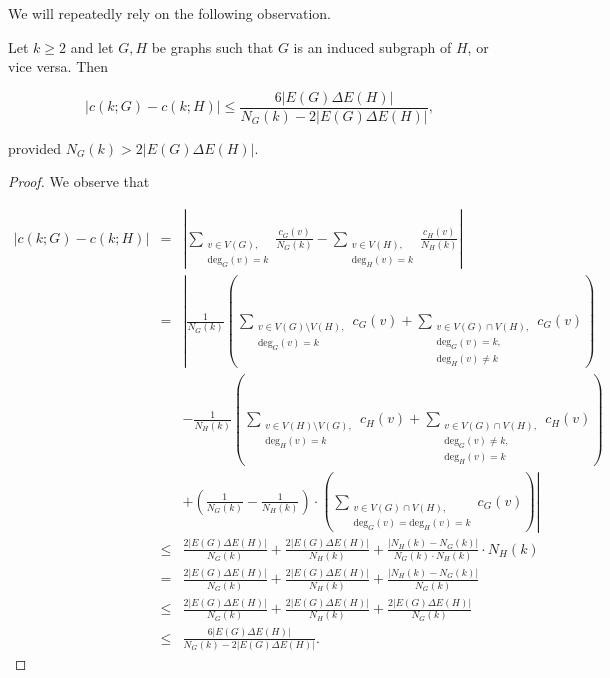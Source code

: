 We will repeatedly rely on the following observation.

\begin{lemma}\label{lem:ckGckH}
Let $k\geq 2$ and let $G, H$ be graphs such that $G$ is an induced subgraph of $H$, or vice versa.
Then

$$ \left| c(k;G) - c(k;H) \right| \leq \frac{6|E(G)\Delta E(H)|}{N_G(k) - 2|E(G)\Delta E(H)|}, $$

\noindent
provided $N_G(k) > 2|E(G)\Delta E(H)|$.
\end{lemma}

\begin{proof} 
We observe that
 
$$ \begin{array}{rcl} 
|c(k; G)-c(k;H)| 
& = & \displaystyle
\left| \sum_{\substack{v\in V(G), \\ \text{deg}_G(v)=k}} \frac{c_G(v)}{N_G(k)} - 
\sum_{\substack{v\in V(H), \\ \text{deg}_{H}(v)=k}} \frac{c_{H}(v)}{N_{H}(k)} \right| \\[8ex]
& = & \displaystyle 
\left| \frac{1}{N_G(k)} \left( \sum_{\substack{v\in V(G)\setminus V(H), \\ \text{deg}_G(v)=k} } c_G(v)
+ \sum_{\substack{v\in V(G)\cap V(H), \\ \text{deg}_G(v)=k, \\ \text{deg}_{H}(v)\neq k}} c_G(v) \right) \right. \\
& & \displaystyle
- \frac{1}{N_{H}(k)} \left(\sum_{\substack{ v\in V(H)\setminus V(G), \\ \text{deg}_{H}(v)=k} } c_{H}(v)
+ \sum_{\substack{v\in V(G)\cap V(H), \\ \text{deg}_G(v)\neq k, \\ \text{deg}_{H}(v)=k}} c_{H}(v) \right) \\
& & \displaystyle  
\left. + \left(\frac{1}{N_G(k)}-\frac{1}{N_{H}(k)} \right) \cdot 
\left( \sum_{\substack{v \in V(G)\cap V(H), \\ \text{deg}_G(v)=\text{deg}_{H}(v)=k}}
c_G(v) \right) \right| \\[8ex]
 & \leq & \displaystyle
 \frac{2|E(G)\Delta E(H)|}{N_G(k)} + \frac{2|E(G)\Delta E(H)|}{N_{H}(k)} + 
 \frac{|N_{H}(k) - N_G(k)|}{N_G(k)\cdot N_{H}(k)} \cdot N_{H}(k) \\[5ex]
 & = & \displaystyle 
 \frac{2|E(G)\Delta E(H)|}{N_G(k)} + \frac{2|E(G)\Delta E(H)|}{N_{H}(k)} + \frac{|N_{H}(k) - N_G(k)|}{N_G(k)} \\[5ex]
 & \leq & \displaystyle
 \frac{2|E(G)\Delta E(H)|}{N_G(k)} + \frac{2|E(G)\Delta E(H)|}{N_{H}(k)} + \frac{2|E(G)\Delta E(H)|}{N_G(k)} \\[5ex]
 & \leq & \displaystyle
\frac{6 |E(G)\Delta E(H)|}{N_G(k)-2|E(G)\Delta E(H)|}.
\end{array} $$


\end{proof}
